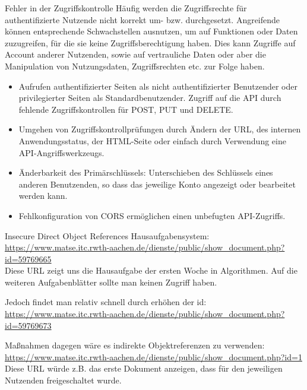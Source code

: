 \begin{defi}{Fehler in der Zugriffskontrolle}
    Häufig werden die Zugriffsrechte für authentifizierte Nutzende nicht korrekt um- bzw. durchgesetzt.
    Angreifende können entsprechende Schwachstellen ausnutzen, um auf Funktionen oder Daten zuzugreifen, für die sie keine Zugriffsberechtigung haben.
    Dies kann Zugriffe auf Account anderer Nutzenden, sowie auf vertrauliche Daten oder aber die Manipulation von Nutzungsdaten, Zugriffsrechten etc. zur Folge haben.

    \begin{itemize}
        \item Aufrufen authentifizierter Seiten als nicht authentifizierter Benutzender oder privilegierter Seiten als Standardbenutzender.
              Zugriff auf die API durch fehlende Zugriffskontrollen für POST, PUT und DELETE.
        \item Umgehen von Zugriffskontrollprüfungen durch Ändern der URL, des internen Anwendungsstatus, der HTML-Seite oder einfach durch Verwendung eine API-Angriffswerkzeugs.
        \item Änderbarkeit des Primärschlüssels: Unterschieben des Schlüssels eines anderen Benutzenden, so dass das jeweilige Konto angezeigt oder bearbeitet werden kann.
        \item Fehlkonfiguration von CORS ermöglichen einen unbefugten API-Zugriffs.
    \end{itemize}
\end{defi}

\begin{example}{Insecure Direct Object References}
    Hausaufgabensystem: \\
    \url{https://www.matse.itc.rwth-aachen.de/dienste/public/show\_document.php?id=59769665} \\
    Diese URL zeigt uns die Hausaufgabe der ersten Woche in Algorithmen.
    Auf die weiteren Aufgabenblätter sollte man keinen Zugriff haben.

    Jedoch findet man relativ schnell durch erhöhen der id: \\
    \url{https://www.matse.itc.rwth-aachen.de/dienste/public/show\_document.php?id=59769673}

    Maßnahmen dagegen wäre es indirekte Objektreferenzen zu verwenden: \\
    \url{https://www.matse.itc.rwth-aachen.de/dienste/public/show\_document.php?id=1} \\
    Diese URL würde z.B. das erste Dokument anzeigen, dass für den jeweiligen Nutzenden freigeschaltet wurde.
\end{example}

